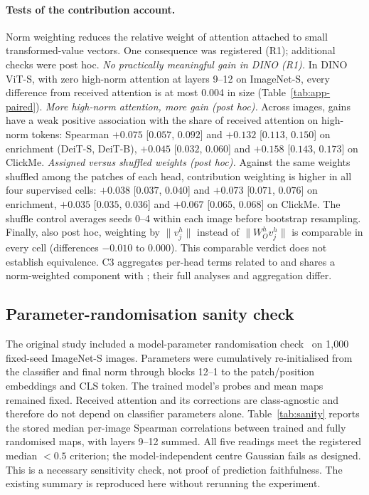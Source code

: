 \paragraph{Tests of the contribution account.} Norm weighting reduces the relative weight of attention attached to small transformed-value vectors. One consequence was registered (R1); additional checks were post hoc. \emph{No practically meaningful gain in DINO (R1).} In DINO ViT-S, with zero high-norm attention at layers 9--12 on ImageNet-S, every difference from received attention is at most 0.004 in size (Table~\ref{tab:app-paired}). \emph{More high-norm attention, more gain (post hoc).} Across images, gains have a weak positive association with the share of received attention on high-norm tokens: Spearman $+0.075$ [$0.057$, $0.092$] and $+0.132$ [$0.113$, $0.150$] on enrichment (DeiT-S, DeiT-B), $+0.045$ [$0.032$, $0.060$] and $+0.158$ [$0.143$, $0.173$] on ClickMe. \emph{Assigned versus shuffled weights (post hoc).} Against the same weights shuffled among the patches of each head, contribution weighting is higher in all four supervised cells: $+0.038$ [$0.037$, $0.040$] and $+0.073$ [$0.071$, $0.076$] on enrichment, $+0.035$ [$0.035$, $0.036$] and $+0.067$ [$0.065$, $0.068$] on ClickMe. The shuffle control averages seeds 0--4 within each image before bootstrap resampling. Finally, also post hoc, weighting by $\lVert v_j^h\rVert$ instead of $\lVert W_O^h v_j^h\rVert$ is comparable in every cell (differences $-0.010$ to $0.000$). This comparable verdict does not establish equivalence. C3 aggregates per-head terms related to \citet{kobayashi2020} and shares a norm-weighted component with \citet{zhu2024}; their full analyses and aggregation differ.

\subsection{Parameter-randomisation sanity check}
\label{app:sanity}

The original study included a model-parameter randomisation check~\citep{adebayo2018} on 1,000 fixed-seed ImageNet-S images. Parameters were cumulatively re-initialised from the classifier and final norm through blocks 12--1 to the patch/position embeddings and CLS token. The trained model's probes and mean maps remained fixed. Received attention and its corrections are class-agnostic and therefore do not depend on classifier parameters alone. Table~\ref{tab:sanity} reports the stored median per-image Spearman correlations between trained and fully randomised maps, with layers 9--12 summed. All five readings meet the registered median $<0.5$ criterion; the model-independent centre Gaussian fails as designed. This is a necessary sensitivity check, not proof of prediction faithfulness. The existing summary is reproduced here without rerunning the experiment.

